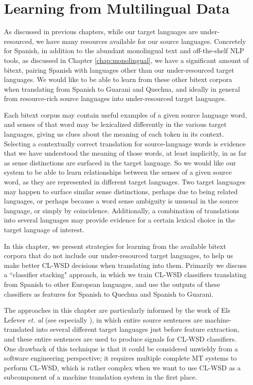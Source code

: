 \chapter{Learning from Multilingual Data}
\label{chap:multilingual}

As discussed in previous chapters, while our target languages are
under-resourced, we have many resources available for our source languages.
Concretely for Spanish, in addition to the abundant monolingual text and
off-the-shelf NLP tools, as discussed in Chapter \ref{chap:monolingual}, we
have a significant amount of bitext, pairing Spanish with languages other than
our under-resourced target languages. We would like to be able to learn from
these other bitext corpora when translating from Spanish to Guarani and
Quechua, and ideally in general from resource-rich source languages into
under-resourced target languages.

Each bitext corpus may contain useful examples of a given source language word,
and senses of that word may be lexicalized differently in the various target
languages, giving us clues about the meaning of each token in its context.
Selecting a contextually correct translation for source-language words is
evidence that we have understood the meaning of those words, at least
implicitly, in as far as sense distinctions are surfaced in the target
language. So we would like our system to be able to learn relationships between
the senses of a given source word, as they are represented in different target
languages. Two target languages may happen to surface similar sense
distinctions, perhaps due to being related languages, or perhaps because a word
sense ambiguity is unusual in the source language, or simply by coincidence.
Additionally, a combination of translations into several languages may provide
evidence for a certain lexical choice in the target language of interest.

In this chapter, we present strategies for learning from the available bitext
corpora that do not include our under-resourced target languages, to help us
make better CL-WSD decisions when translating into them. Primarily we discuss a
``classifier stacking" approach, in which we train CL-WSD classifiers
translating from Spanish to other European languages, and use the outputs of
these classifiers as features for Spanish to Quechua and Spanish to Guarani.

The approaches in this chapter are particularly informed by the work of Els
Lefever \emph{et. al} (see especially
\cite{lefever-hoste-decock:2011:ACL-HLT2011}), in which entire source sentences
are machine-translated into several different target languages just before
feature extraction, and these entire sentences are used to produce signals for
CL-WSD classifiers. One drawback of this technique is that it could be
considered unwieldy from a software engineering perspective; it requires
multiple complete MT systems to perform CL-WSD, which is rather complex when we
want to use CL-WSD as a subcomponent of a machine translation system in the
first place.

